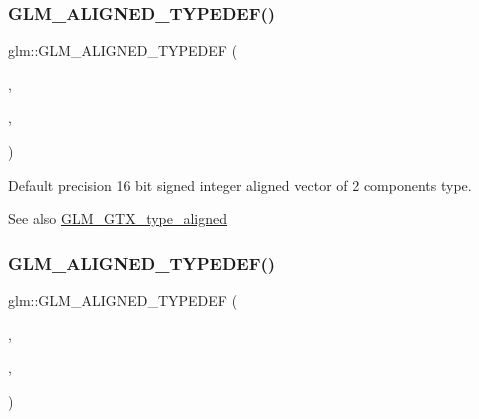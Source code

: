\subsubsection{\texorpdfstring{G\+L\+M\+\_\+\+A\+L\+I\+G\+N\+E\+D\+\_\+\+T\+Y\+P\+E\+D\+E\+F()}{GLM\_ALIGNED\_TYPEDEF()}\hspace{0.1cm}{\footnotesize\ttfamily [58/209]}}
{\footnotesize\ttfamily glm\+::\+G\+L\+M\+\_\+\+A\+L\+I\+G\+N\+E\+D\+\_\+\+T\+Y\+P\+E\+D\+EF (\begin{DoxyParamCaption}\item[{\hyperlink{group__gtc__type__precision_ga37af364ff13fb791571dd324dfd3ca89}{i16vec2}}]{,  }\item[{aligned\+\_\+i16vec2}]{,  }\item[{4}]{ }\end{DoxyParamCaption})}

Default precision 16 bit signed integer aligned vector of 2 components type. \begin{DoxySeeAlso}{See also}
\hyperlink{group__gtx__type__aligned}{G\+L\+M\+\_\+\+G\+T\+X\+\_\+type\+\_\+aligned} 
\end{DoxySeeAlso}
\mbox{\label{group__gtx__type__aligned_gaaee91dd2ab34423bcc11072ef6bd0f02}} 
\subsubsection{\texorpdfstring{G\+L\+M\+\_\+\+A\+L\+I\+G\+N\+E\+D\+\_\+\+T\+Y\+P\+E\+D\+E\+F()}{GLM\_ALIGNED\_TYPEDEF()}\hspace{0.1cm}{\footnotesize\ttfamily [59/209]}}
{\footnotesize\ttfamily glm\+::\+G\+L\+M\+\_\+\+A\+L\+I\+G\+N\+E\+D\+\_\+\+T\+Y\+P\+E\+D\+EF (\begin{DoxyParamCaption}\item[{\hyperlink{group__gtc__type__precision_ga85e903f028d903b416a1119b00af57ea}{i16vec3}}]{,  }\item[{aligned\+\_\+i16vec3}]{,  }\item[{8}]{ }\end{DoxyParamCaption})}

